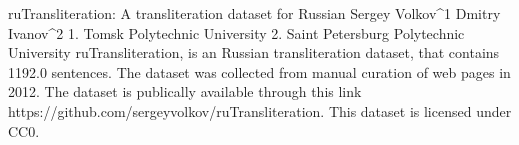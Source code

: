 
ruTransliteration: A transliteration dataset for Russian
Sergey Volkov^1 Dmitry Ivanov^2
1. Tomsk Polytechnic University 2. Saint Petersburg Polytechnic University
ruTransliteration, is an Russian transliteration dataset, that contains 1192.0 sentences.
The dataset was collected from manual curation of web pages in 2012. 
The dataset is publically available through this link https://github.com/sergeyvolkov/ruTransliteration. This dataset is licensed under CC0.

